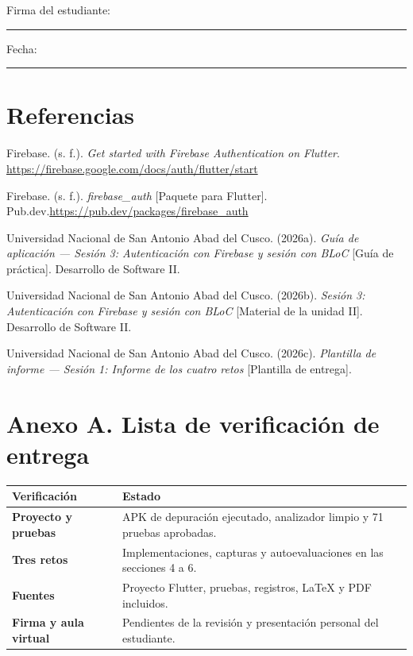 \documentclass[11pt,letterpaper]{article}
\makeatletter
\newcommand{\tabla}[2]{\par\smallskip\begin{tabularx}{\linewidth}{@{}>{\bfseries\color{vino}}p{.28\linewidth}X@{}}\toprule\rowcolor{rosa}#1\\\midrule #2\bottomrule\end{tabularx}\par}
\makeatother
\begin{document}
Firma del estudiante: \rule{6cm}{.4pt}\hfill Fecha: \rule{2.5cm}{.4pt}
\section{Referencias}
Firebase. (s. f.). \textit{Get started with Firebase Authentication on Flutter}. \url{https://firebase.google.com/docs/auth/flutter/start}

Firebase. (s. f.). \textit{firebase\_auth} [Paquete para Flutter]. Pub.dev.\newline\url{https://pub.dev/packages/firebase_auth}

Universidad Nacional de San Antonio Abad del Cusco. (2026a). \textit{Guía de aplicación — Sesión 3: Autenticación con Firebase y sesión con BLoC} [Guía de práctica]. Desarrollo de Software II.

Universidad Nacional de San Antonio Abad del Cusco. (2026b). \textit{Sesión 3: Autenticación con Firebase y sesión con BLoC} [Material de la unidad II]. Desarrollo de Software II.

Universidad Nacional de San Antonio Abad del Cusco. (2026c). \textit{Plantilla de informe — Sesión 1: Informe de los cuatro retos} [Plantilla de entrega].
\section*{Anexo A. Lista de verificación de entrega}
\tabla{Verificación & Estado}{Proyecto y pruebas & APK de depuración ejecutado, analizador limpio y 71 pruebas aprobadas.\\Tres retos & Implementaciones, capturas y autoevaluaciones en las secciones 4 a 6.\\Fuentes & Proyecto Flutter, pruebas, registros, LaTeX y PDF incluidos.\\Firma y aula virtual & Pendientes de la revisión y presentación personal del estudiante.\\}
\end{document}
